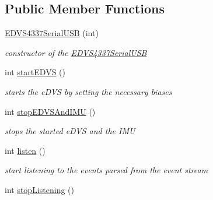 \subsection*{Public Member Functions}
\begin{DoxyCompactItemize}
\item 
\hyperlink{class_e_d_v_s4337_serial_u_s_b_ab5f0ccc2d17dff50b7d282693db5f8e1}{E\+D\+V\+S4337\+Serial\+U\+S\+B} (int)
\begin{DoxyCompactList}\small\item\em constructor of the \hyperlink{class_e_d_v_s4337_serial_u_s_b}{E\+D\+V\+S4337\+Serial\+U\+S\+B} \end{DoxyCompactList}\item 
\hypertarget{class_e_d_v_s4337_serial_u_s_b_a69696b4657eb069eaa54f88a77e88cae}{}int \hyperlink{class_e_d_v_s4337_serial_u_s_b_a69696b4657eb069eaa54f88a77e88cae}{start\+E\+D\+V\+S} ()\label{class_e_d_v_s4337_serial_u_s_b_a69696b4657eb069eaa54f88a77e88cae}

\begin{DoxyCompactList}\small\item\em starts the e\+D\+V\+S by setting the necessary biases \end{DoxyCompactList}\item 
\hypertarget{class_e_d_v_s4337_serial_u_s_b_aa2d18776b99e4171f20e8814093bbe14}{}int \hyperlink{class_e_d_v_s4337_serial_u_s_b_aa2d18776b99e4171f20e8814093bbe14}{stop\+E\+D\+V\+S\+And\+I\+M\+U} ()\label{class_e_d_v_s4337_serial_u_s_b_aa2d18776b99e4171f20e8814093bbe14}

\begin{DoxyCompactList}\small\item\em stops the started e\+D\+V\+S and the I\+M\+U \end{DoxyCompactList}\item 
\hypertarget{class_e_d_v_s4337_serial_u_s_b_a944eee88553b63a6b0be88b0288e9199}{}int \hyperlink{class_e_d_v_s4337_serial_u_s_b_a944eee88553b63a6b0be88b0288e9199}{listen} ()\label{class_e_d_v_s4337_serial_u_s_b_a944eee88553b63a6b0be88b0288e9199}

\begin{DoxyCompactList}\small\item\em start listening to the events parsed from the event stream \end{DoxyCompactList}\item 
\hypertarget{class_e_d_v_s4337_serial_u_s_b_ae219efb04db44707bf67928f986969d1}{}int \hyperlink{class_e_d_v_s4337_serial_u_s_b_ae219efb04db44707bf67928f986969d1}{stop\+Listening} ()\label{class_e_d_v_s4337_serial_u_s_b_ae219efb04db44707bf67928f986969d1}


\end{DoxyCompactItemize}
